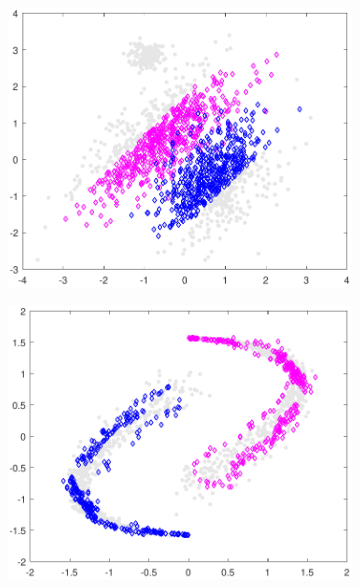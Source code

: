 \documentclass[preprint,12pt]{elsarticle}
\begin{document}
	\begin{figure}[!htb]
	\centering
	\begin{subfigure}[b]{0.40\linewidth}
		\centering\includegraphics[width=1\linewidth]{figures/normdatamodel_landm1.pdf}
		\caption{\label{fig:sparse1}} 
	\end{subfigure}
	\begin{subfigure}[b]{0.40\linewidth}
		\centering\includegraphics[width=1\linewidth]{figures/yydatamodel_landm1.pdf}
		\caption{\label{fig:sparse2}}
	\end{subfigure} \\
	

\end{figure}
\end{document}

